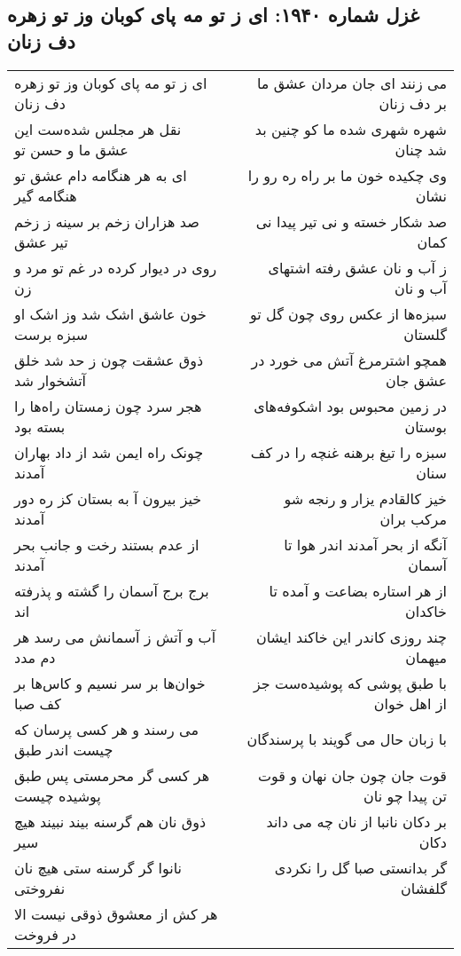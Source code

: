 \begin{center}
\section*{غزل شماره ۱۹۴۰: ای ز تو مه پای کوبان وز تو زهره دف زنان}
\label{sec:1940}
\begin{longtable}{l p{0.5cm} r}
ای ز تو مه پای کوبان وز تو زهره دف زنان
&&
می زنند ای جان مردان عشق ما بر دف زنان
\\
نقل هر مجلس شده‌ست این عشق ما و حسن تو
&&
شهره شهری شده ما کو چنین بد شد چنان
\\
ای به هر هنگامه دام عشق تو هنگامه گیر
&&
وی چکیده خون ما بر راه ره رو را نشان
\\
صد هزاران زخم بر سینه ز زخم تیر عشق
&&
صد شکار خسته و نی تیر پیدا نی کمان
\\
روی در دیوار کرده در غم تو مرد و زن
&&
ز آب و نان عشق رفته اشتهای آب و نان
\\
خون عاشق اشک شد وز اشک او سبزه برست
&&
سبزه‌ها از عکس روی چون گل تو گلستان
\\
ذوق عشقت چون ز حد شد خلق آتشخوار شد
&&
همچو اشترمرغ آتش می خورد در عشق جان
\\
هجر سرد چون زمستان راه‌ها را بسته بود
&&
در زمین محبوس بود اشکوفه‌های بوستان
\\
چونک راه ایمن شد از داد بهاران آمدند
&&
سبزه را تیغ برهنه غنچه را در کف سنان
\\
خیز بیرون آ به بستان کز ره دور آمدند
&&
خیز کالقادم یزار و رنجه شو مرکب بران
\\
از عدم بستند رخت و جانب بحر آمدند
&&
آنگه از بحر آمدند اندر هوا تا آسمان
\\
برج برج آسمان را گشته و پذرفته اند
&&
از هر استاره بضاعت و آمده تا خاکدان
\\
آب و آتش ز آسمانش می رسد هر دم مدد
&&
چند روزی کاندر این خاکند ایشان میهمان
\\
خوان‌ها بر سر نسیم و کاس‌ها بر کف صبا
&&
با طبق پوشی که پوشیده‌ست جز از اهل خوان
\\
می رسند و هر کسی پرسان که چیست اندر طبق
&&
با زبان حال می گویند با پرسندگان
\\
هر کسی گر محرمستی پس طبق پوشیده چیست
&&
قوت جان چون جان نهان و قوت تن پیدا چو نان
\\
ذوق نان هم گرسنه بیند نبیند هیچ سیر
&&
بر دکان نانبا از نان چه می داند دکان
\\
نانوا گر گرسنه ستی هیچ نان نفروختی
&&
گر بدانستی صبا گل را نکردی گلفشان
\\
هر کش از معشوق ذوقی نیست الا در فروخت

\end{longtable}
\end{center}
